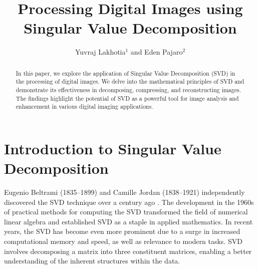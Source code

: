 \documentclass[12pt, reqno]{amsart}
\theoremstyle{definition}
\theoremstyle{remark}
\numberwithin{equation}{section}
\begin{document}
\setcounter{page}{1}

\title[Processing Digital Images using Singular Value Decomposition]{Processing Digital Images using Singular Value Decomposition}

\author[Y. Lakhotia, E. Pajaro]{Yuvraj Lakhotia$^1$ and Eden Pajaro$^2$}

\address{$^{1}$ Edison Academy Magnet School, Edison, NJ 08837, USA.}
\email{\textcolor[rgb]{0.00,0.00,0.84}{lakhotiay@mcmsnj.net}}

\address{$^{2}$ Edison Academy Magnet School, Edison, NJ 08837, USA.}
\email{\textcolor[rgb]{0.00,0.00,0.84}{pajaroe@mcmsnj.net}}


\begin{abstract}
In this paper, we explore the application of Singular Value Decomposition (SVD) in the processing of digital images. We delve into the mathematical principles of SVD and demonstrate its effectiveness in decomposing, compressing, and reconstructing images. The findings highlight the potential of SVD as a powerful tool for image analysis and enhancement in various digital imaging applications.
\end{abstract} \maketitle
\section{Introduction to Singular Value Decomposition}
\noindent Eugenio Beltrami (1835–1899) and Camille Jordan (1838–1921) independently discovered the SVD technique over a century ago \cite{Compton}. The development in the 1960s of practical methods for computing the SVD transformed the field of numerical linear algebra and established SVD as a staple in applied mathematics. In recent years, the SVD has become even more prominent due to a surge in increased computational memory and speed, as well as relevance to modern tasks. SVD involves decomposing a matrix into three constituent matrices, enabling a better understanding of the inherent structures within the data.
\end{document}
